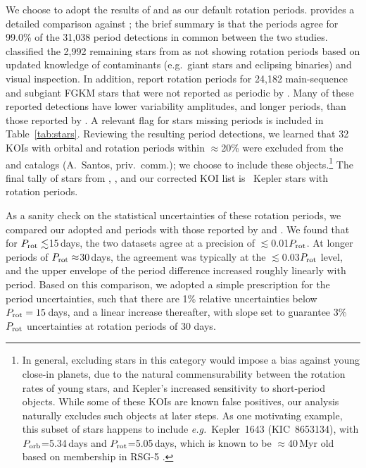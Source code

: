 \documentclass[11pt,twocolumn,tighten]{aastex63}
\begin{document}
We choose to adopt the results of  and
 as our default rotation periods.
 provides a detailed comparison against
; the brief summary is that the periods
agree for 99.0\% of the 31{,}038 period detections in common between
the two studies.   classified the 2{,}992
remaining stars from  as not showing
rotation periods based on updated knowledge of contaminants
(e.g.~giant stars and eclipsing binaries) and visual inspection.  In
addition,  report rotation periods for
24{,}182 main-sequence and subgiant FGKM stars that were not reported
as periodic by .  Many of these reported
detections have lower variability amplitudes, and longer periods, than
those reported by .  A relevant flag for
stars missing  periods is included in
Table~\ref{tab:stars}.  Reviewing the resulting
period detections, we learned that 32 KOIs with orbital and rotation
periods within $\approx$20\% were excluded from the
 and  catalogs
(A.~Santos, priv.~comm.); we choose to include these
objects.\footnote{In general, excluding stars in this category would
impose a bias against young close-in planets, due to the natural
commensurability between the rotation rates of young stars, and
Kepler's increased sensitivity to short-period objects.  While some of
these KOIs are known false positives, our analysis naturally excludes
such objects at later steps.  As one motivating example, this subset
of stars happens to include {\it e.g.}~Kepler~1643 (KIC~8653134), with
$P_{\rm orb}$=5.34\,days and $P_{\rm rot}$=5.05\,days, which is known
to be $\approx$40\,Myr old based on membership in RSG-5
\citep{Bouma_2022b}.  } The final tally of stars from
, , and our corrected
KOI list is \nuniqstarsantosrot\ Kepler stars with rotation periods.


As a sanity check on the statistical uncertainties of these rotation
periods, we compared our adopted  and
 periods with those reported by
\citet{McQuillan_2014} and \citet{Mazeh_2015}.  We found that for
$P_{\rm rot}\lesssim$15\,days, the two datasets agree at a precision
of $\lesssim$0.01$P_{\rm rot}$.  At longer periods of $P_{\rm
rot}\approx$30\,days, the agreement was typically at the
$\lesssim$0.03$P_{\rm rot}$ level, and the upper envelope of the
period difference increased roughly linearly with period.  Based on
this comparison, we adopted a simple prescription for the period
uncertainties, such that there are 1\% relative uncertainties below
$P_{\rm rot}=15$\,days, and a linear increase thereafter, with slope
set to guarantee 3\% $P_{\rm rot}$ uncertainties at rotation periods
of 30 days.
\end{document}
